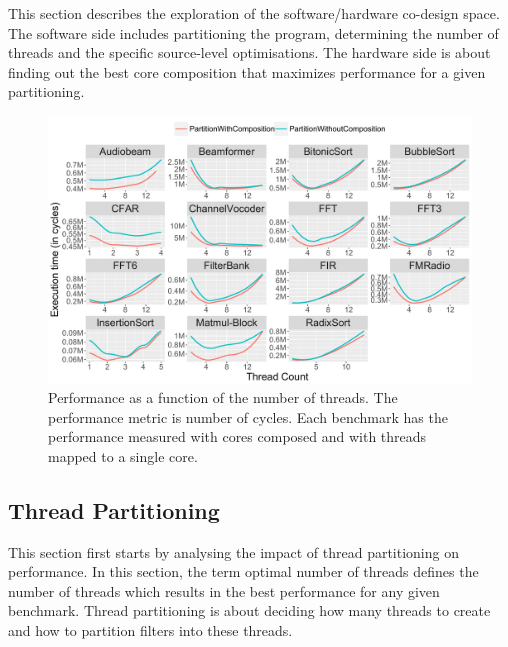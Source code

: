 This section describes the exploration of the software/hardware co-design space.
The software side includes partitioning the program, determining the number of threads and the specific source-level optimisations.
The hardware side is about finding out the best core composition that maximizes performance for a given partitioning.

\begin{figure}[t]
 \centering
    \includegraphics[width=1\textwidth]{streamit-paper/graphics/threadingmaybe4.pdf}
    \caption{Performance as a function of the number of threads. The performance metric is number of cycles. Each benchmark has the performance measured with cores composed and with threads mapped to a single core.}\label{fig:threadtrend}
\end{figure}

\subsection{Thread Partitioning}

This section first starts by analysing the impact of thread partitioning on performance.
In this section, the term optimal number of threads defines the number of threads which results in the best performance for any given benchmark.
Thread partitioning is about deciding how many threads to create and how to partition filters into these threads.

